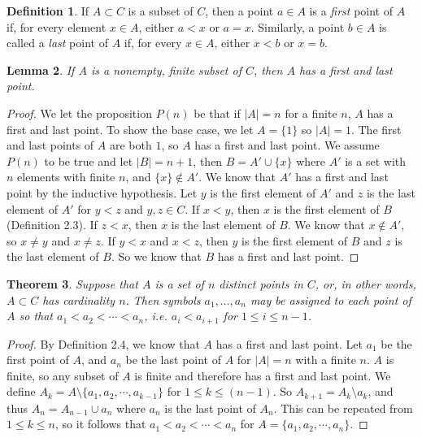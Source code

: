 \documentclass[12pt]{article}
\renewcommand{\_}[1]{\underline{ #1 }}
\newtheorem{theorem}{Theorem}[section]
\newtheorem{lemma}[theorem]{Lemma}
\theoremstyle{definition}
\newtheorem{definition}[theorem]{Definition}
\numberwithin{equation}{subsection}
\begin{document}
\begin{definition}  If $A \subset C$ is a subset of $C$, then a point $a \in A$ is a \emph{first} point of $A$ if, for every element $x \in A$, either $a < x$ or $a = x$.  Similarly, a point $b \in A$ is called a \emph{last} point of $A$ if, for every $x \in A$, either $x < b$ or $x = b$.
\end{definition}

\begin{lemma}  If $A$ is a nonempty, finite subset of $C$, then $A$ has a first and last point.
\end{lemma}

\begin{proof}
We let the proposition $P(n)$ be that if $|A| = n$ for a finite $n$, $A$ has a first and last point. To show the base case, we let $A = \{1\}$ so $|A| = 1$. The first and last points of $A$ are both $1$, so $A$ has a first and last point. We assume $P(n)$ to be true and let $|B| = n + 1$, then $B = A' \cup \{x\}$ where $A'$ is a set with $n$ elements with finite $n$, and $\{x\} \not \in A'$. We know that $A'$ has a first and last point by the inductive hypothesis. Let $y$ is the first element of $A'$ and $z$ is the last element of $A'$ for $y < z$ and $y,z \in C$. If $x < y$, then $x$ is the first element of $B$ (Definition 2.3). If $z < x$, then $x$ is the last element of $B$. We know that $x \not \in A'$, so $x \not = y$ and $x \not = z$. If $y < x$ and $x < z$, then $y$ is the first element of $B$ and $z$ is the last element of $B$. So we know that $B$ has a first and last point.
\end{proof}

\begin{theorem}  Suppose that $A$ is a set of $n$ distinct points in $C$, or, in other words, $A \subset C$ has cardinality $n$.  Then symbols $a_1, \dotsc, a_n$ may be assigned to each point of $A$ so that $a_1 < a_2 < \dotsm < a_n$, i.e. $a_i < a_{i + 1}$ for $1 \leq i \leq n - 1$.
\end{theorem}

\begin{proof}
By Definition 2.4, we know that $A$ has a first and last point. Let $a_1$ be the first point of $A$, and $a_n$ be the last point of $A$ for $|A| = n$ with a finite $n$. $A$ is finite, so any subset of $A$ is finite and therefore has a first and last point. We define $A_k = A \setminus \{a_1,a_2,\dotsm,a_{k-1}\}$ for $1 \leq k \leq (n-1)$. So $A_{k+1} = A_k \setminus a_k$, and thus $A_n = A_{n-1} \cup a_n$ where $a_n$ is the last point of $A_n$. This can be repeated from $1 \leq k \leq n$, so it follows that $a_1 < a_2 < \dotsm < a_n$ for $A = \{a_1, a_2, \dotsm , a_n\}$. 
\end{proof}
\end{document}

